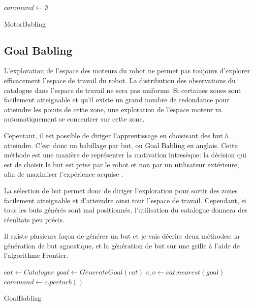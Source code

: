 \documentclass[11pt,french]{report}
\begin{document}
\begin{algorithm}[h]
    \DontPrintSemicolon
    \LinesNumbered
    $command \leftarrow \emptyset$ \;
    \caption{\label{alg:MotorBabling} MotorBabling}
\end{algorithm}

\pagebreak

\subsection{Goal Babling}

L'exploration de l'espace des moteurs du robot ne permet pas toujours d'explorer efficacement l'espace de travail du robot.
La distribution des observations du catalogue dans l'espace de travail ne sera pas uniforme.
Si certaines zones sont facilement atteignable et qu'il existe un grand nombre de redondance pour atteindre les points de cette zone, une exploration de l'espace moteur va automatiquement se concentrer sur cette zone.

\phantom{INVISIBLE LINE}

Cepentant, il est possible de diriger l'apprentissage en choisisant des but à atteindre.
C'est donc un babillage par but, ou Goal Babling en anglais.
Cette méthode est une manière de représenter la motivation intresèque: la décision qui est de choisir le but est prise par le robot et non par un utilisateur extérieure, afin de maximiser l'expérience acquise \cite{Intrinsic_motivation}.

\phantom{INVISIBLE LINE}

La sélection de but permet donc de diriger l'exploration pour sortir des zones facilement atteignable et d'atteindre ainsi tout l'espace de travail.
Cependant, si tous les buts générés sont mal positionnés, l'utilisation du catalogue donnera des résultats peu précis.

\phantom{INVISIBLE LINE}

Il existe plusieurs façon de générer un but et je vais décrire deux méthodes: la génération de but agnostique, et la génération de but sur une grille à l'aide de l'algorithme Frontier.

\begin{algorithm}[h]
    \DontPrintSemicolon
    \LinesNumbered
    $cat \leftarrow Catalogue$\;
    $goal \leftarrow GenerateGoal(cat)$ \;
    $c, o \leftarrow cat.nearest(goal)$ \;
    $command \leftarrow c.perturb()$ \;
    \caption{\label{alg:GoalBabling} GoalBabling}
\end{algorithm}
\end{document}
